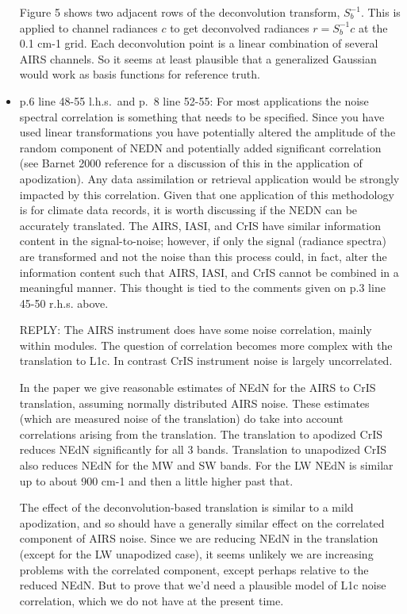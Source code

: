 \documentclass[11pt]{article}
\newcommand {\reply} {\mbox{\small REPLY}}
\begin{document}
\begin{itemize}
  Figure 5 shows two adjacent rows of the deconvolution transform,
  $S_b^{-1}$.  This is applied to channel radiances $c$ to get
  deconvolved radiances $r = S_b^{-1} c$ at the 0.1 cm-1 grid.  Each
  deconvolution point is a linear combination of several AIRS
  channels.  So it seems at least plausible that a generalized
  Gaussian would work as basis functions for reference truth.


\item p.6 line 48-55 l.h.s.~and p.~8 line 52-55: For most
  applications the noise spectral correlation is something that
  needs to be specified.  Since you have used linear transformations
  you have potentially altered the amplitude of the random component
  of NEDN and potentially added significant correlation (see Barnet
  2000 reference for a discussion of this in the application of
  apodization). Any data assimilation or retrieval application would
  be strongly impacted by this correlation. Given that one
  application of this methodology is for climate data records, it is
  worth discussing if the NEDN can be accurately translated.  The
  AIRS, IASI, and CrIS have similar information content in the
  signal-to-noise; however, if only the signal (radiance spectra)
  are transformed and not the noise than this process could, in
  fact, alter the information content such that AIRS, IASI, and CrIS
  cannot be combined in a meaningful manner. This thought is tied to
  the comments given on p.3 line 45-50 r.h.s. above.

  \reply: The AIRS instrument does have some noise correlation,
  mainly within modules.  The question of correlation becomes more
  complex with the translation to L1c.  In contrast CrIS instrument
  noise is largely uncorrelated.  

  In the paper we give reasonable estimates of NEdN for the AIRS to
  CrIS translation, assuming normally distributed AIRS noise.  These
  estimates (which are measured noise of the translation) do take
  into account correlations arising from the translation.  The
  translation to apodized CrIS reduces NEdN significantly for all 3
  bands.  Translation to unapodized CrIS also reduces NEdN for the
  MW and SW bands.  For the LW NEdN is similar up to about 900 cm-1
  and then a little higher past that.

  The effect of the deconvolution-based translation is similar to a
  mild apodization, and so should have a generally similar effect on
  the correlated component of AIRS noise.  Since we are reducing
  NEdN in the translation (except for the LW unapodized case), it
  seems unlikely we are increasing problems with the correlated
  component, except perhaps relative to the reduced NEdN.  But to
  prove that we'd need a plausible model of L1c noise correlation,
  which we do not have at the present time.


\end{itemize}
\end{document}
